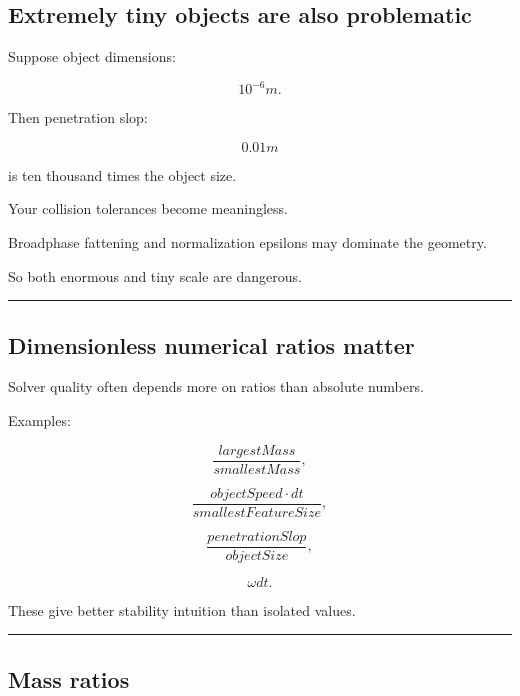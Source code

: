 \subsection{Extremely tiny objects are also problematic}\label{06-engine-ii-ch039-extremely-tiny-objects-are-also-problematic}

\hypertarget{06-engine-ii-ch039-extremely-tiny-objects-are-also-problematic}{}

Suppose object dimensions:

\[
10^{-6}m.
\]

Then penetration slop:

\[
0.01m
\]

is ten thousand times the object size.

Your collision tolerances become meaningless.

Broadphase fattening and normalization epsilons may dominate the geometry.

So both enormous and tiny scale are dangerous.

\begin{center}\rule{0.5\linewidth}{0.5pt}\end{center}

\subsection{Dimensionless numerical ratios matter}\label{06-engine-ii-ch039-dimensionless-numerical-ratios-matter}

\hypertarget{06-engine-ii-ch039-dimensionless-numerical-ratios-matter}{}

Solver quality often depends more on ratios than absolute numbers.

Examples:

\[
\frac{largestMass}{smallestMass},
\]

\[
\frac{objectSpeed\cdot dt}{smallestFeatureSize},
\]

\[
\frac{penetrationSlop}{objectSize},
\]

\[
\omega dt.
\]

These give better stability intuition than isolated values.

\begin{center}\rule{0.5\linewidth}{0.5pt}\end{center}

\subsection{Mass ratios}\label{06-engine-ii-ch039-mass-ratios}

